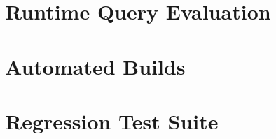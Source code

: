 \section{Runtime Query Evaluation}\label{sec:runtime-query}

\section{Automated Builds}\label{sec:automated-builds}

\section{Regression Test Suite}\label{sec:regression-suite}

